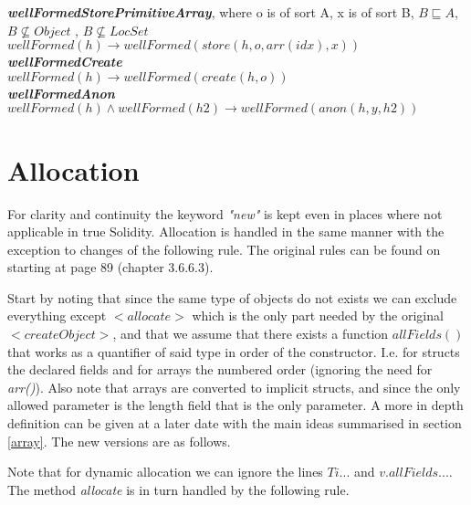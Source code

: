 \documentclass{article}
\begin{document}
	\textit{\textbf{wellFormedStorePrimitiveArray}},  where o is of sort A, x is of sort B, $B \sqsubseteq A$, $B \nsubseteq Object$ , $B \nsubseteq LocSet$ \\
	$wellFormed(h) \to wellFormed(store(h,o,arr(idx), x))$\\
	
	\textit{\textbf{wellFormedCreate}} \\
	$wellFormed(h) \to wellFormed(create(h,o))$\\
	
	\textit{\textbf{wellFormedAnon}} \\
	$wellFormed(h)\land wellFormed(h2) \to wellFormed(anon(h, y,h2))$\\
	
	\section{Allocation} \label{alloc}
	For clarity and continuity the keyword \textit{"new"} is kept even in places where not applicable in true Solidity. Allocation is handled in the same manner with the exception to changes of the following rule. The original rules can be found on starting at page 89 (chapter 3.6.6.3). 
	
	Start by noting that since the same type of objects do not exists we can exclude everything except $<allocate>$ which is the only part needed by the original $<createObject>$, and that we assume that there exists a function $allFields()$ that works as a quantifier of said type in order of the constructor. I.e. for structs the declared fields and for arrays the numbered order (ignoring the need for \textit{arr()}). Also note that arrays are converted to implicit structs, and since the only allowed parameter is the length field that is the only parameter. A more in depth definition can be given at a later date with the main ideas summarised in section \ref{array}. The new versions are as follows. 
	
	\begin{prooftree}
	\end{prooftree}
	
	Note that for dynamic allocation we can ignore the lines $Ti ...$ and $v.allFields ...$. The method \textit{allocate} is in turn handled by the following rule. 
	
\end{document}
